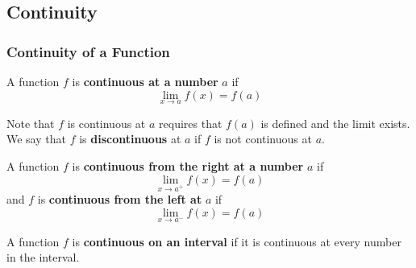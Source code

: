 \subsection{Continuity}

\subsubsection*{Continuity of a Function}
\begin{definition}
    A function \(f\) is \textbf{continuous at a number} \(a\) if
    \[\lim_{x\to a}f(x)=f(a)\]
\end{definition}
Note that \(f\)  is continuous at \(a\) requires that \(f(a)\) is defined and
the limit exists.
We say that \(f\) is \textbf{discontinuous} at \(a\) if \(f\) is not
continuous at \(a\).
\begin{definition}
    A function \(f\) is \textbf{continuous from the right at a number} \(a\)
    if
    \[\lim_{x\to a^+}f(x)=f(a)\]
    and \(f\) is \textbf{continuous from the left at} \(a\) if
    \[\lim_{x\to a^-}f(x)=f(a)\]
\end{definition}
\begin{definition}
    A function \(f\) is \textbf{continuous on an interval} if it is continuous
    at every number in the interval.
\end{definition}

